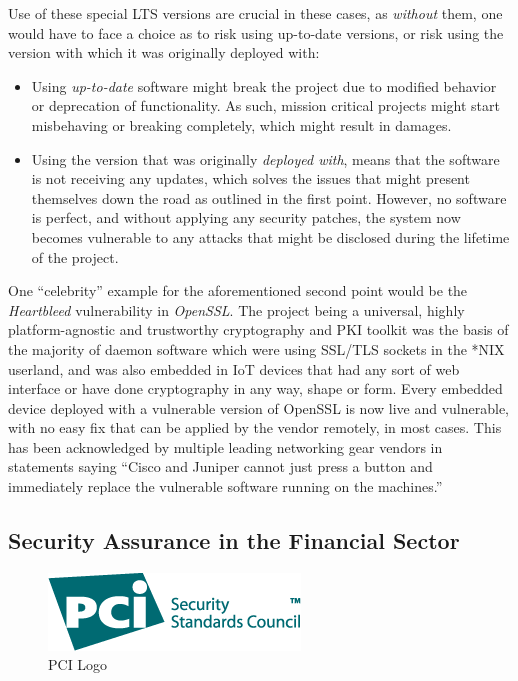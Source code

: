 \documentclass[a4paper,12pt]{article}
\begin{document}
	Use of these special LTS versions are crucial in these cases, as \textit{without} them, one would have to face a choice as to risk using up-to-date versions, or risk using the version with which it was originally deployed with:
	
	\begin{itemize}
		\item Using \textit{up-to-date} software might break the project due to modified behavior or deprecation of functionality. As such, mission critical projects might start misbehaving or breaking completely, which might result in damages.
		\item Using the version that was originally \textit{deployed with}, means that the software is not receiving any updates, which solves the issues that might present themselves down the road as outlined in the first point. However, no software is perfect, and without applying any security patches, the system now becomes vulnerable to any attacks that might be disclosed during the lifetime of the project.
	\end{itemize}
	
	One ``celebrity'' example for the aforementioned second point would be the \textit{Heartbleed} vulnerability in \textit{OpenSSL}. The project being a universal, highly platform-agnostic and trustworthy cryptography and PKI toolkit was the basis of the majority of daemon software which were using SSL/TLS sockets in the *NIX userland, and was also embedded in IoT devices that had any sort of web interface or have done cryptography in any way, shape or form. Every embedded device deployed with a vulnerable version of OpenSSL is now live and vulnerable, with no easy fix that can be applied by the vendor remotely, in most cases. This has been acknowledged by multiple leading networking gear vendors in statements saying ``Cisco and Juniper cannot just press a button and immediately replace the vulnerable software running on the machines.''\cite{jpaglier14}
	
\subsection{Security Assurance in the Financial Sector} \label{secassfinsec}
 

	\begin{figure}
		\vspace{-10pt}
		\centering
		\includegraphics[scale=0.5]{pci.png}
		\caption{PCI Logo}
	\end{figure}
\end{document}
